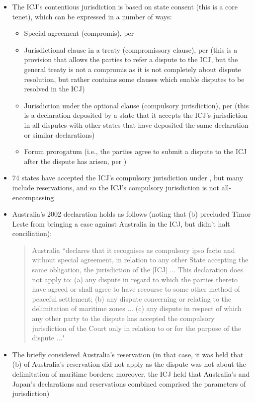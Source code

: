 \begin{itemize}
    \item The ICJ's contentious jurisdiction is based on state consent (this is a core tenet), which can be expressed in a number of ways:
    \begin{itemize}
        \item Special agreement (compromis), per 
        \item Jurisdictional clause in a treaty (compromissory clause), per  (this is a provision that allows the parties to refer a dispute to the ICJ, but the general treaty is not a compromis as it is not completely about dispute resolution, but rather contains some clauses which enable disputes to be resolved in the ICJ)
        \item Jurisdiction under the optional clause (compulsory jurisdiction), per  (this is a declaration deposited by a state that it accepts the ICJ's jurisdiction in all disputes with other states that have deposited the same declaration or similar declarations)
        \item Forum prorogatum (i.e., the parties agree to submit a dispute to the ICJ after the dispute has arisen, per )
    \end{itemize}
    \item 74 states have accepted the ICJ's compulsory jurisdiction under , but many include reservations, and so the ICJ's compulsory jurisdiction is not all-encompassing
    \item Australia's 2002 declaration holds as follows (noting that (b) precluded Timor Leste from bringing a case against Australia in the ICJ, but didn't halt conciliation):
    \begin{quote}
        Australia ``declares that it recognises as compulsory ipso facto and without special agreement, in relation to any other State accepting the same obligation, the jurisdiction of the [ICJ] ... This declaration does not apply to: (a) any dispute in regard to which the parties thereto have agreed or shall agree to have recourse to some other method of peaceful settlement; (b) any dispute concerning or relating to the delimitation of maritime zones ... (c) any dispute in respect of which any other party to the dispute has accepted the compulsory jurisdiction of the Court only in relation to or for the purpose of the dispute ..."
    \end{quote}
    \item The  briefly considered Australia's reservation (in that case, it was held that (b) of Australia's reservation did not apply as the dispute was not about the delimitation of maritime borders; moreover, the ICJ held that Australia's and Japan's declarations and reservations combined comprised the parameters of jurisdiction)
\end{itemize}

